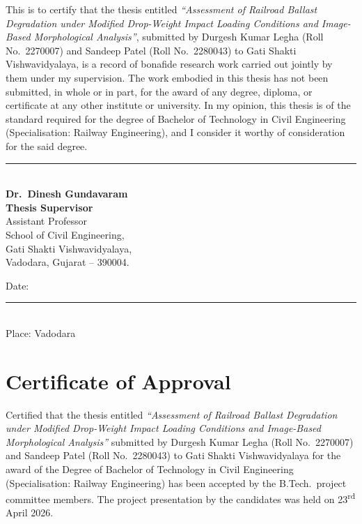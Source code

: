 This is to certify that the thesis entitled \emph{``Assessment of Railroad Ballast Degradation under Modified Drop-Weight Impact Loading Conditions and Image-Based Morphological Analysis''}, submitted by Durgesh Kumar Legha (Roll No.\ 2270007) and Sandeep Patel (Roll No.\ 2280043) to Gati Shakti Vishwavidyalaya, is a record of bonafide research work carried out jointly by them under my supervision. The work embodied in this thesis has not been submitted, in whole or in part, for the award of any degree, diploma, or certificate at any other institute or university. In my opinion, this thesis is of the standard required for the degree of Bachelor of Technology in Civil Engineering (Specialisation: Railway Engineering), and I consider it worthy of consideration for the said degree.

\vspace{2.2cm}
\noindent
\begin{minipage}[t]{0.55\textwidth}
\rule{6cm}{0.4pt}\\[2pt]
\textbf{Dr.\ Dinesh Gundavaram}\\
\textbf{Thesis Supervisor}\\
Assistant Professor\\
School of Civil Engineering,\\
Gati Shakti Vishwavidyalaya,\\
Vadodara, Gujarat -- 390004.
\end{minipage}

\vspace{1.0cm}
\noindent Date: \rule{4cm}{0.4pt}\\[4pt]
Place: Vadodara

\chapter*{Certificate of Approval}

Certified that the thesis entitled \emph{``Assessment of Railroad Ballast Degradation under Modified Drop-Weight Impact Loading Conditions and Image-Based Morphological Analysis''} submitted by Durgesh Kumar Legha (Roll No.\ 2270007) and Sandeep Patel (Roll No.\ 2280043) to Gati Shakti Vishwavidyalaya for the award of the Degree of Bachelor of Technology in Civil Engineering (Specialisation: Railway Engineering) has been accepted by the B.Tech.\ project committee members. The project presentation by the candidates was held on 23\textsuperscript{rd} April 2026.

